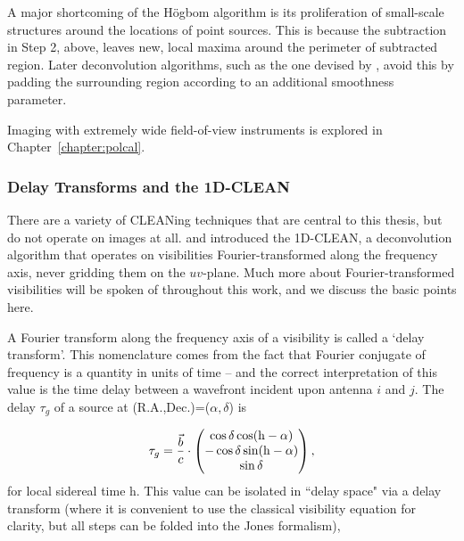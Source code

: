 A major shortcoming of the H{\"o}gbom algorithm is its proliferation of small-scale structures around the locations of point sources. This is because the subtraction in Step 2, above, leaves new, local maxima around the perimeter of subtracted region. Later deconvolution algorithms, such as the one devised by \cite{Cornwell.83}, avoid this by padding the surrounding region according to an additional smoothness parameter. 

Imaging with extremely wide field-of-view instruments is explored in Chapter~\ref{chapter:polcal}.

\subsubsection{Delay Transforms and the 1D-CLEAN}

There are a variety of CLEANing techniques that are central to this thesis, but do not operate on images at all.
\cite{ParsonsBacker.09} and \cite{Parsons.12a} introduced the 1D-CLEAN, a deconvolution algorithm that operates on visibilities Fourier-transformed along the frequency axis, never gridding them on the $uv$-plane. Much more about Fourier-transformed visibilities will be spoken of throughout this work, and we discuss the basic points here.

A Fourier transform along the frequency axis of a visibility is called a `delay transform'. This nomenclature comes from the fact that Fourier conjugate of frequency is a quantity in units of time -- and the correct interpretation of this value is the time delay between a wavefront incident upon antenna $i$ and $j$. The delay $\tau_g$ of a source at (R.A.,Dec.)=($\alpha,\delta$) is

\begin{equation}
\tau_g = \frac{\vec{b}}{c}\cdot
\begin{pmatrix}
\cos\delta\cos({\rm h}-\alpha) \\
-\cos\delta\sin({\rm h}-\alpha) \\
\sin\delta \\
\end{pmatrix},
\end{equation}
for local sidereal time h. This value can be isolated in ``delay space" via a delay transform (where it is convenient to use the classical visibility equation for clarity, but all steps can be folded into the Jones formalism),


